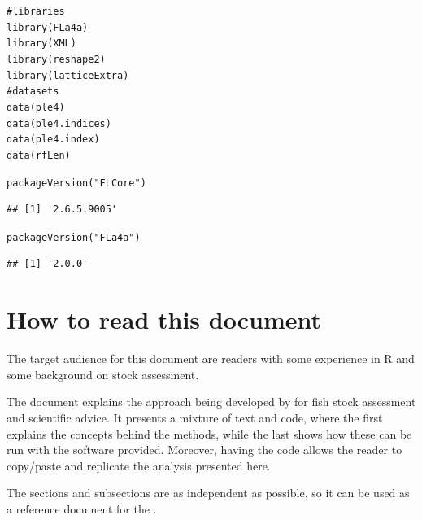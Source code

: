 \documentclass[a4paper,english,10pt]{article}\usepackage[]{graphicx}\usepackage[]{color}
\makeatletter
\newcommand{\hlstr}[1]{\textcolor[rgb]{0.063,0.58,0.627}{#1}}%
\newcommand{\hlcom}[1]{\textcolor[rgb]{0.588,0.588,0.588}{#1}}%
\newcommand{\hlstd}[1]{\textcolor[rgb]{0.196,0.196,0.196}{#1}}%
\newcommand{\hlkwd}[1]{\textcolor[rgb]{0.78,0.227,0.412}{#1}}%
\newenvironment{kframe}{%
 \def\at@end@of@kframe{}%
 \ifinner\ifhmode%
  \def\at@end@of@kframe{\end{minipage}}%
  \begin{minipage}{\columnwidth}%
 \fi\fi%
 \def\FrameCommand##1{\hskip\@totalleftmargin \hskip-\fboxsep
 \colorbox{shadecolor}{##1}\hskip-\fboxsep
     \hskip-\linewidth \hskip-\@totalleftmargin \hskip\columnwidth}%
 \MakeFramed {\advance\hsize-\width
   \@totalleftmargin\z@ \linewidth\hsize
   \@setminipage}}%
 {\par\unskip\endMakeFramed%
 \at@end@of@kframe}
\newenvironment{knitrout}{}{} %
\makeatother
\begin{document}
\begin{knitrout}
\color{fgcolor}\begin{kframe}
\begin{alltt}
\hlcom{# libraries}
\hlkwd{library}\hlstd{(FLa4a)}
\hlkwd{library}\hlstd{(XML)}
\hlkwd{library}\hlstd{(reshape2)}
\hlkwd{library}\hlstd{(latticeExtra)}
\hlcom{# datasets}
\hlkwd{data}\hlstd{(ple4)}
\hlkwd{data}\hlstd{(ple4.indices)}
\hlkwd{data}\hlstd{(ple4.index)}
\hlkwd{data}\hlstd{(rfLen)}
\end{alltt}
\end{kframe}
\end{knitrout}

\begin{knitrout}
\color{fgcolor}\begin{kframe}
\begin{alltt}
\hlkwd{packageVersion}\hlstd{(}\hlstr{"FLCore"}\hlstd{)}
\end{alltt}
\begin{verbatim}
## [1] '2.6.5.9005'
\end{verbatim}
\begin{alltt}
\hlkwd{packageVersion}\hlstd{(}\hlstr{"FLa4a"}\hlstd{)}
\end{alltt}
\begin{verbatim}
## [1] '2.0.0'
\end{verbatim}
\end{kframe}
\end{knitrout}



\section{How to read this document}

The target audience for this document are readers with some experience in R and some background on stock assessment.

The document explains the approach being developed by \aFa for fish stock assessment and scientific advice. It presents a mixture of text and code, where the first explains the concepts behind the methods, while the last shows how these can be run with the software provided. Moreover, having the code allows the reader to copy/paste and replicate the analysis presented here.

The sections and subsections are as independent as possible, so it can be used as a reference document for the . 
\end{document}
